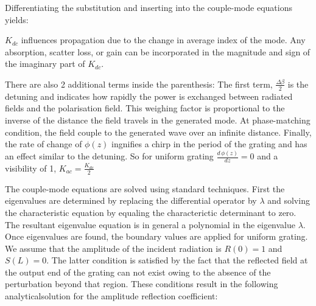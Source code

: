 \documentclass[11pt, openright]{book}
\begin{document}
         Differentiating the substitution and inserting into the couple-mode equations yields: 

         $K_{dc}$ influences propagation due to the change in average index of the mode. Any absorption, scatter loss, or gain can be incorporated in the magnitude and sign of the imaginary part of $K_{dc}$.

         There are also 2 additional terms inside the parenthesis: The first term, $\frac{\Delta\beta}{2}$ is the detuning and indicates how rapidly the power is exchanged between radiated fields and the polarisation field. This weighing factor is proportional to the inverse of the distance the field travels in the generated mode. At phase-matching condition, the field couple to the generated wave over an infinite distance. Finally, the rate of change of $\phi(z)$ ingnifies a chirp in the period of the grating and has an effect similar to the detuning. So for uniform grating $\frac{d\, \phi(z)}{d z} =0$ and a visibility of 1, $K_{ac}=\frac{K_{dc}}{2}$

         The couple-mode equations are solved using standard techniques. First the eigenvalues are determined by replacing the differential operator by $\lambda$ and solving the characteristic equation by equaling the characterictic determinant to zero. The resultant eigenvalue equation is in general a polynomial in the eigenvalue $\lambda$. Once eigenvalues are found, the boundary values are applied for uniform grating. We assume that the amplitude of the incident radiation is $R(0)=1$ and $S(L)=0$. The latter condition is satisfied by the fact that the reflected field at the output end of the grating can not exist owing to the absence of the perturbation beyond that region. These conditions result in the following analyticalsolution for the amplitude reflection coefficient: 
\end{document}
